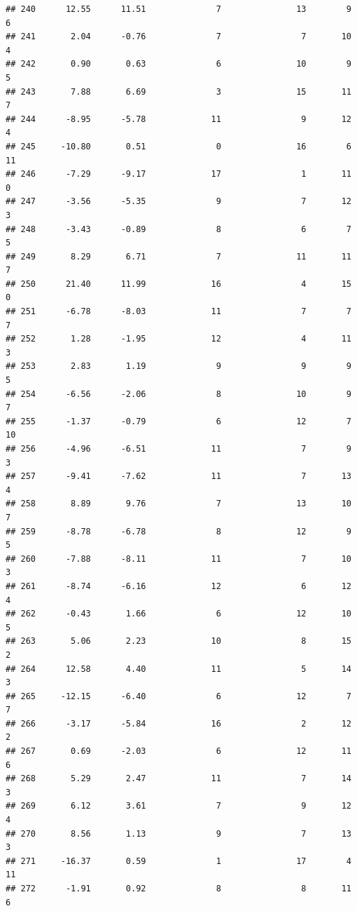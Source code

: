 \documentclass[]{book}
\begin{document}
\begin{verbatim}
## 240      12.55      11.51              7               13        9          6
## 241       2.04      -0.76              7                7       10          4
## 242       0.90       0.63              6               10        9          5
## 243       7.88       6.69              3               15       11          7
## 244      -8.95      -5.78             11                9       12          4
## 245     -10.80       0.51              0               16        6         11
## 246      -7.29      -9.17             17                1       11          0
## 247      -3.56      -5.35              9                7       12          3
## 248      -3.43      -0.89              8                6        7          5
## 249       8.29       6.71              7               11       11          7
## 250      21.40      11.99             16                4       15          0
## 251      -6.78      -8.03             11                7        7          7
## 252       1.28      -1.95             12                4       11          3
## 253       2.83       1.19              9                9        9          5
## 254      -6.56      -2.06              8               10        9          7
## 255      -1.37      -0.79              6               12        7         10
## 256      -4.96      -6.51             11                7        9          3
## 257      -9.41      -7.62             11                7       13          4
## 258       8.89       9.76              7               13       10          7
## 259      -8.78      -6.78              8               12        9          5
## 260      -7.88      -8.11             11                7       10          3
## 261      -8.74      -6.16             12                6       12          4
## 262      -0.43       1.66              6               12       10          5
## 263       5.06       2.23             10                8       15          2
## 264      12.58       4.40             11                5       14          3
## 265     -12.15      -6.40              6               12        7          7
## 266      -3.17      -5.84             16                2       12          2
## 267       0.69      -2.03              6               12       11          6
## 268       5.29       2.47             11                7       14          3
## 269       6.12       3.61              7                9       12          4
## 270       8.56       1.13              9                7       13          3
## 271     -16.37       0.59              1               17        4         11
## 272      -1.91       0.92              8                8       11          6

\end{verbatim}
\end{document}
